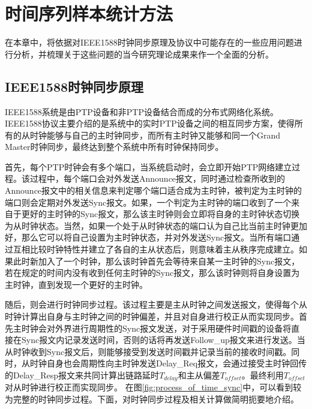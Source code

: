 
\chapter{时间序列样本统计方法}
\label{chap:1588_theory}
在本章中，将依据对IEEE1588时钟同步原理及协议中可能存在的一些应用问题进行分析，并梳理关于这些问题的当今研究理论成果来作一个全面的分析。

\section{IEEE1588时钟同步原理}
IEEE1588系统是由PTP设备和非PTP设备结合而成的分布式网络化系统。IEEE1588协议主要介绍的是系统中的实时PTP设备之间的相互同步方案，使得所有的从时钟能够与自己的主时钟同步，而所有主时钟又能够和同一个Grand Master时钟同步，最终达到整个系统中所有时钟保持同步。

首先，每个PTP时钟会有多个端口，当系统启动时，会立即开始PTP网络建立过程。该过程中，每个端口会对外发送Announce报文，同时通过检查所收到的Announce报文中的相关信息来判定哪个端口适合成为主时钟，被判定为主时钟的端口则会定期对外发送Sync报文。如果，一个判定为主时钟的端口收到了一个来自于更好的主时钟的Sync报文，那么该主时钟则会立即将自身的主时钟状态切换为从时钟状态。当然，如果一个处于从时钟状态的端口认为自己比当前主时钟更加好，那么它可以将自己设置为主时钟状态，并对外发送Sync报文。当所有端口通过互相比较时钟特性并建立了各自的主从状态后，则意味着主从秩序完成建立。如果此时新加入了一个时钟，那么该时钟首先会等待来自某一主时钟的Sync报文，若在规定的时间内没有收到任何主时钟的Sync报文，那么该时钟则将自身设置为主时钟，直到发现一个更好的主时钟。

随后，则会进行时钟同步过程。该过程主要是主从时钟之间发送报文，使得每个从时钟计算出自身与主时钟之间的时钟偏差，并且对自身进行校正从而实现同步。首先主时钟会对外界进行周期性的Sync报文发送，对于采用硬件时间戳的设备将直接在Sync报文内记录发送时间，否则的话将再发送Follow\_up报文来进行发送。当从时钟收到Sync报文后，则能够接受到发送时间戳并记录当前的接收时间戳。同时，从时钟自身也会周期性向主时钟发送Delay\_Req报文，会通过接受主时钟回传的Delay\_Resp报文来共同计算出链路延时$T_{delay}$和主从偏差$T_{offset}$。最终利用$T_{offset}$对从时钟进行校正而实现同步。
\label{sec:1588_theory_sync}
在图\ref{fig:process_of_time_sync}中，可以看到较为完整的时钟同步过程。下面，对时钟同步过程及相关计算做简明扼要地介绍。

